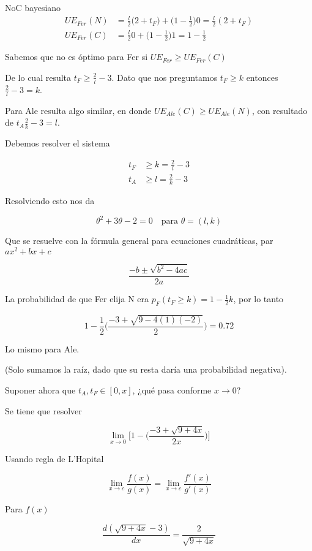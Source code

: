 \documentclass[12pt]{article}
\begin{document}
\begin{exbox}{NoC bayesiano}
	\begin{align*}
		UE_{Fer}(N) & = \frac{l}{2}\Bigg(2+t_F\Bigg) + \Bigg(1-\frac{1}{2}\Bigg)0=\frac{l}{2}(2+t_F) \\
		UE_{Fer}(C) & = \frac{l}{2}0 + \Bigg(1-\frac{1}{2}\Bigg)1=1-\frac{1}{2}
	\end{align*}

	Sabemos que no es óptimo para Fer si $UE_{Fer} \geq UE_{Fer}(C)$

	De lo cual resulta $t_F \geq \frac{2}{l}-3$. Dato que nos preguntamos $t_F\geq k$ entonces $\frac{2}{l}-3= k$.

	Para Ale resulta algo similar, en donde $UE_{Ale}(C)\geq UE_{Ale}(N)$, con resultado de $t_{A}\frac{2}{k}-3=l$.

	Debemos resolver el sistema

	\begin{align*}
		t_{F} & \geq k = \frac{2}{l}-3 \\
		t_A   & \geq l = \frac{2}{k}-3
	\end{align*}

	Resolviendo esto nos da

	\[
		\theta^2 + 3\theta - 2=0\quad \text{para } \theta=(l, k)
	\]

	Que se resuelve con la fórmula general para ecuaciones cuadráticas, par $ax^2 + bx + c$

	\[
		\frac{-b \pm \sqrt{b^2 - 4ac}}{2a}
	\]

	La probabilidad de que Fer elija N era $p_F(t_F\geq k) = 1 - \frac{1}{2}k$, por lo tanto

	\[
		1 - \frac{1}{2} \Bigg(\frac{-3 + \sqrt{9 - 4(1)(-2)}}{2}\Bigg) = 0.72
	\]

	Lo mismo para Ale.

	(Solo sumamos la raíz, dado que su resta daría una probabilidad negativa).

	Suponer ahora que $t_A, t_F \in [0, x]$, ¿qué pasa conforme $x \rightarrow 0$?

	Se tiene que resolver

	\[
		\lim_{x\rightarrow 0} \Bigg [ 1 - \Bigg ( \frac{-3+\sqrt{9+4x}}{2x} \Bigg) \Bigg ]
	\]

	Usando regla de L'Hopital

	\[
		\lim_{x\rightarrow c} \frac{f(x)}{g(x)} = \lim_{x\rightarrow c} \frac{f'(x)}{g'(x)}
	\]

	Para $f(x)$

	\[
		\frac{d(\sqrt{9+4x} - 3)}{dx} = \frac{2}{\sqrt{9+4x}}
	\]


\end{exbox}
\end{document}
